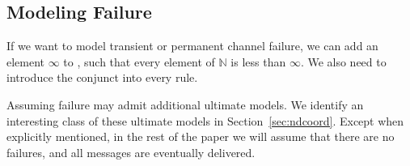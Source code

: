 \subsection{Modeling Failure}
\label{sec:failure}

If we want \lang to model transient or permanent channel failure, we can add an element $\infty$ to , such that every element of $\mathbb{N}$ is less than $\infty$.  We also need to introduce the conjunct  into every \lang rule.

Assuming failure may admit additional ultimate models.  We identify an interesting class of these ultimate models in Section~\ref{sec:ndcoord}.  Except when explicitly mentioned, in the rest of the paper we will assume that there are no failures, and all messages are eventually delivered.

